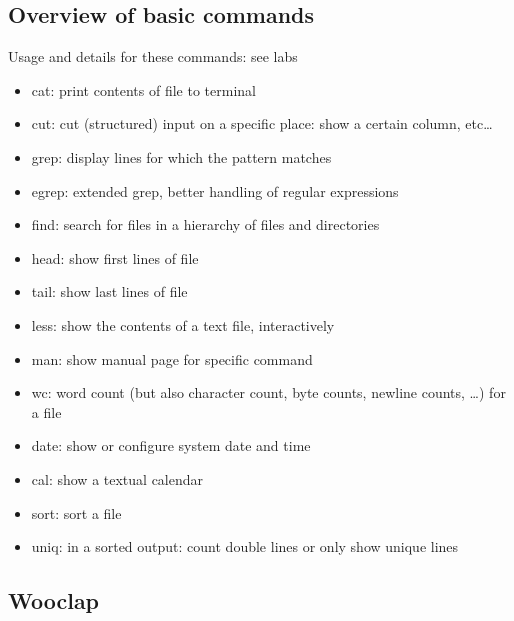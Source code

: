 \documentclass{article}
\begin{document}
\subsection{Overview of basic commands}

Usage and details for these commands: see labs

\begin{itemize}
    \item cat: print contents of file to terminal
    \item cut: cut (structured) input on a specific place: show a certain column, etc\dots
    \item grep: display lines for which the pattern matches
    \item egrep: extended grep, better handling of regular expressions
    \item find: search for files in a hierarchy of files and directories
    \item head: show first lines of file
    \item tail: show last lines of file
    \item less: show the contents of a text file, interactively
    \item man: show manual page for specific command
    \item wc: word count (but also character count, byte counts, newline counts, \dots) for a file
    \item date: show or configure system date and time
    \item cal: show a textual calendar
    \item sort: sort a file
    \item uniq: in a sorted output: count double lines or only show unique lines
\end{itemize}

\subsection{Wooclap}
\end{document}

